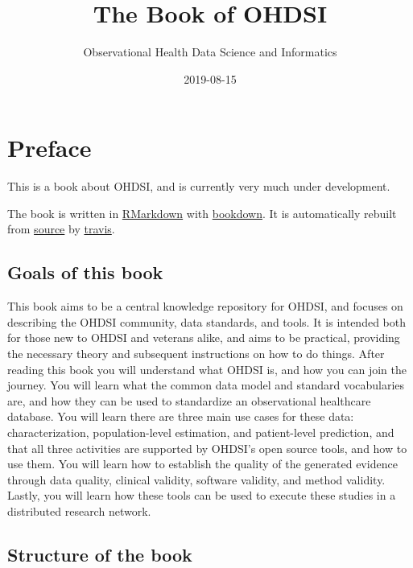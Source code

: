 \documentclass[11pt]{book}
\title{The Book of OHDSI}
\author{Observational Health Data Science and Informatics}
\date{2019-08-15}
\theoremstyle{definition}
\theoremstyle{definition}
\theoremstyle{definition}
\theoremstyle{remark}
\begin{document}
\maketitle

{
\setcounter{tocdepth}{1}
\tableofcontents
}
\hypertarget{preface}{%
\chapter*{Preface}\label{preface}}

This is a book about OHDSI, and is currently very much under development.

The book is written in \href{https://rmarkdown.rstudio.com}{RMarkdown} with \href{https://bookdown.org}{bookdown}. It is automatically rebuilt from \href{https://github.com/OHDSI/TheBookOfOhdsi}{source} by \href{http://travis-ci.org/}{travis}.

\hypertarget{goals-of-this-book}{%
\section*{Goals of this book}\label{goals-of-this-book}}

This book aims to be a central knowledge repository for OHDSI, and focuses on describing the OHDSI community, data standards, and tools. It is intended both for those new to OHDSI and veterans alike, and aims to be practical, providing the necessary theory and subsequent instructions on how to do things. After reading this book you will understand what OHDSI is, and how you can join the journey. You will learn what the common data model and standard vocabularies are, and how they can be used to standardize an observational healthcare database. You will learn there are three main use cases for these data: characterization, population-level estimation, and patient-level prediction, and that all three activities are supported by OHDSI's open source tools, and how to use them. You will learn how to establish the quality of the generated evidence through data quality, clinical validity, software validity, and method validity. Lastly, you will learn how these tools can be used to execute these studies in a distributed research network.

\hypertarget{structure-of-the-book}{%
\section*{Structure of the book}\label{structure-of-the-book}}
\end{document}
